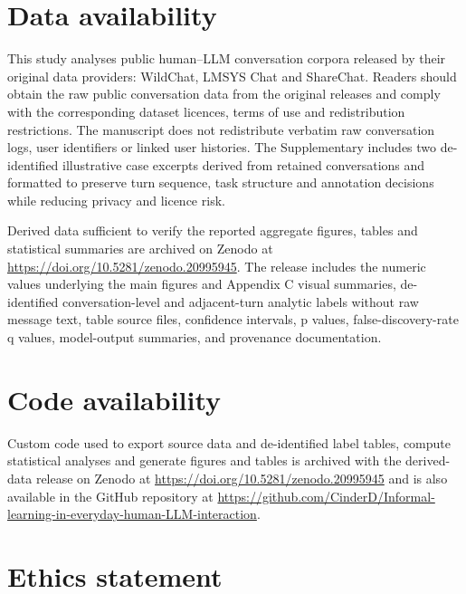 \section*{Data availability}

This study analyses public human--LLM conversation corpora released by their original data providers: WildChat, LMSYS Chat and ShareChat. Readers should obtain the raw public conversation data from the original releases and comply with the corresponding dataset licences, terms of use and redistribution restrictions. The manuscript does not redistribute verbatim raw conversation logs, user identifiers or linked user histories. The Supplementary includes two de-identified illustrative case excerpts derived from retained conversations and formatted to preserve turn sequence, task structure and annotation decisions while reducing privacy and licence risk.

Derived data sufficient to verify the reported aggregate figures, tables and statistical summaries are archived on Zenodo at \url{https://doi.org/10.5281/zenodo.20995945}. The release includes the numeric values underlying the main figures and Appendix C visual summaries, de-identified conversation-level and adjacent-turn analytic labels without raw message text, table source files, confidence intervals, p values, false-discovery-rate q values, model-output summaries, and provenance documentation.

\section*{Code availability}

Custom code used to export source data and de-identified label tables, compute statistical analyses and generate figures and tables is archived with the derived-data release on Zenodo at \url{https://doi.org/10.5281/zenodo.20995945} and is also available in the GitHub repository at \url{https://github.com/CinderD/Informal-learning-in-everyday-human-LLM-interaction}. 

\section*{Ethics statement}

